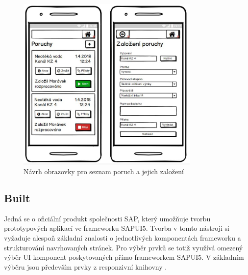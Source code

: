 \documentclass[thesis=M,czech]{FITthesis}[2012/06/26]
\begin{document}
\begin{figure}[H]
	\centering
	\includegraphics[width=0.8\textwidth]{images/bal_poruchy_mob}
	\caption{Návrh obrazovky pro seznam poruch a jejich založení}
	\label{img:bal_poruchy_mob}
\end{figure}

\subsection{Built}
Jedná se o oficiální produkt společnosti SAP, který umožňuje tvorbu prototypových aplikací ve frameworku SAPUI5. Tvorba v tomto nástroji si vyžaduje alespoň základní znalosti o jednotlivých komponentách frameworku a strukturování navrhovaných stránek. Pro výběr prvků se totiž využívá omezený výběr UI komponent poskytovaných přímo frameworkem SAPUI5. V základním výběru jsou především prvky z responzivní knihovny  \cite{builtme}.
\end{document}
